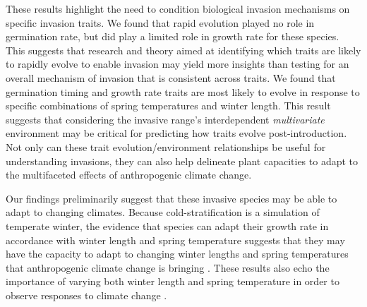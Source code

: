 \documentclass[12pt]{article}\usepackage[]{graphicx}\usepackage[]{color}
\begin{document}
	These results highlight the need to condition biological invasion mechanisms on specific invasion traits. We found that rapid evolution played no role in germination rate, but did play a limited role in growth rate for these species. This suggests that research and theory aimed at identifying which traits are likely to rapidly evolve to enable invasion may yield more insights than testing for an overall mechanism of invasion that is consistent across traits. We found that germination timing and growth rate traits are most likely to evolve in response to specific combinations of spring temperatures and winter length. This result suggests that considering the invasive range's interdependent \textit{multivariate} environment may be critical for predicting how traits evolve post-introduction. 
Not only can these trait evolution/environment relationships be useful for understanding invasions, they can also help delineate plant capacities to adapt to the multifaceted effects of anthropogenic climate change. 
	
	Our findings preliminarily suggest that these invasive species may be able to adapt to changing climates. Because cold-stratification is a simulation of temperate winter, the evidence that species can adapt their growth rate in accordance with winter length and spring temperature suggests that they may have the capacity to adapt to changing winter lengths and spring temperatures that anthropogenic climate change is bringing \parencite{IPCC2015}. These results also echo the  importance of varying both winter length and spring temperature in order to observe responses to climate change \parencite[e.g.,][]{Bernareggi2016}. 
\end{document}
